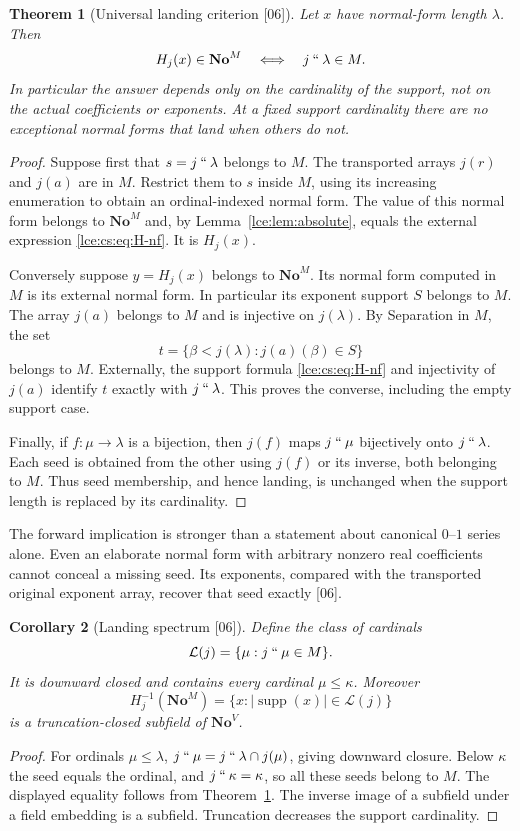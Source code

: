 \documentclass[11pt,letterpaper]{article}
\numberwithin{equation}{section}
\newtheorem{theorem}{Theorem}[section]
\newtheorem{corollary}[theorem]{Corollary}
\theoremstyle{definition}
\theoremstyle{remark}
\newcommand{\No}{\mathbf{No}}
\newcommand{\supp}{\operatorname{supp}}
\newcommand{\imset}[2]{#1\mathbin{``}#2}
\newcommand{\abs}[1]{\lvert#1\rvert}
\newcommand{\thref}[1]{Theorem~\ref{#1}}
\newcommand{\leref}[1]{Lemma~\ref{#1}}
\newcommand{\src}[1]{\textup{\textsf{\small[#1]}}}%
\begin{document}
\begin{theorem}[Universal landing criterion \src{06}]\label{lce:cs:thm:landing}
Let $x$ have normal-form length $\lambda$. Then
\begin{equation}\label{lce:cs:eq:landing}
 H_j(x)\in\No^M\quad\Longleftrightarrow\quad\imset j\lambda\in M.
\end{equation}
In particular the answer depends only on the cardinality of the support,
not on the actual coefficients or exponents. At a fixed support cardinality
there are no exceptional normal forms that land when others do not.
\end{theorem}
\begin{proof}
Suppose first that $s=\imset j\lambda$ belongs to $M$. The transported
arrays $j(r)$ and $j(a)$ are in $M$. Restrict them to $s$ inside $M$, using
its increasing enumeration to obtain an ordinal-indexed normal form. The
value of this normal form belongs to $\No^M$ and, by
\leref{lce:lem:absolute}, equals the external expression
\eqref{lce:cs:eq:H-nf}. It is $H_j(x)$.

Conversely suppose $y=H_j(x)$ belongs to $\No^M$. Its normal form computed
in $M$ is its external normal form. In particular its exponent support $S$
belongs to $M$. The array $j(a)$ belongs to $M$ and is injective on
$j(\lambda)$. By Separation in $M$, the set
\[
 t=\{\beta<j(\lambda):j(a)(\beta)\in S\}
\]
belongs to $M$. Externally, the support formula \eqref{lce:cs:eq:H-nf} and
injectivity of $j(a)$ identify $t$ exactly with $\imset j\lambda$. This proves
the converse, including the empty support case.

Finally, if $f:\mu\to\lambda$ is a bijection, then $j(f)$ maps $\imset j\mu$
bijectively onto $\imset j\lambda$. Each seed is obtained from the other using
$j(f)$ or its inverse, both belonging to $M$. Thus seed membership, and hence
landing, is unchanged when the support length is replaced by its
cardinality.
\end{proof}

The forward implication is stronger than a statement about canonical
$0$--$1$ series alone. Even an elaborate normal form with arbitrary nonzero
real coefficients cannot conceal a missing seed. Its exponents, compared
with the transported original exponent array, recover that seed exactly
\src{06}.

\begin{corollary}[Landing spectrum \src{06}]\label{lce:cs:cor:spectrum}
Define the class of cardinals
\[
 \mathcal L(j)=\{\mu:\imset j\mu\in M\}.
\]
It is downward closed and contains every cardinal $\mu\le\kappa$. Moreover
\[
 H_j^{-1}(\No^M)=\{x:\abs{\supp(x)}\in\mathcal L(j)\}
\]
is a truncation-closed subfield of $\No^V$.
\end{corollary}
\begin{proof}
For ordinals $\mu\le\lambda$, $\imset j\mu=\imset j\lambda\cap j(\mu)$, giving
downward closure. Below $\kappa$ the seed equals the ordinal, and
$\imset j\kappa=\kappa$, so all these seeds belong to $M$. The displayed
equality follows from \thref{lce:cs:thm:landing}. The inverse image of a
subfield under a field embedding is a subfield. Truncation decreases the
support cardinality.
\end{proof}
\end{document}
